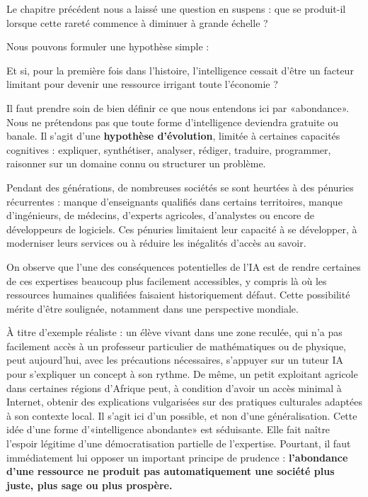 Le chapitre précédent nous a laissé une question en suspens : que se produit-il lorsque cette rareté commence à diminuer à grande échelle ?

Nous pouvons formuler une hypothèse simple :

\begin{aiquote}
Et si, pour la première fois dans l'histoire, l'intelligence cessait d'être un facteur limitant pour devenir une ressource irrigant toute l'économie ?
\end{aiquote}

Il faut prendre soin de bien définir ce que nous entendons ici par «abondance». Nous ne prétendons pas que toute forme d'intelligence deviendra gratuite ou banale. Il s'agit d'une \textbf{hypothèse d'évolution}, limitée à certaines capacités cognitives : expliquer, synthétiser, analyser, rédiger, traduire, programmer, raisonner sur un domaine connu ou structurer un problème.

Pendant des générations, de nombreuses sociétés se sont heurtées à des pénuries récurrentes : manque d'enseignants qualifiés dans certains territoires, manque d'ingénieurs, de médecins, d'experts agricoles, d'analystes ou encore de développeurs de logiciels. Ces pénuries limitaient leur capacité à se développer, à moderniser leurs services ou à réduire les inégalités d'accès au savoir.

On observe que l'une des conséquences potentielles de l'IA est de rendre certaines de ces expertises beaucoup plus facilement accessibles, y compris là où les ressources humaines qualifiées faisaient historiquement défaut. Cette possibilité mérite d'être soulignée, notamment dans une perspective mondiale.

À titre d'exemple réaliste : un élève vivant dans une zone reculée, qui n'a pas facilement accès à un professeur particulier de mathématiques ou de physique, peut aujourd'hui, avec les précautions nécessaires, s'appuyer sur un tuteur IA pour s'expliquer un concept à son rythme. De même, un petit exploitant agricole dans certaines régions d'Afrique peut, à condition d'avoir un accès minimal à Internet, obtenir des explications vulgarisées sur des pratiques culturales adaptées à son contexte local. Il s'agit ici d'un possible, et non d'une généralisation. Cette idée d'une forme d'«intelligence abondante» est séduisante. Elle fait naître l'espoir légitime d'une démocratisation partielle de l'expertise. Pourtant, il faut immédiatement lui opposer un important principe de prudence : \textbf{l'abondance d'une ressource ne produit pas automatiquement une société plus juste, plus sage ou plus prospère.}

